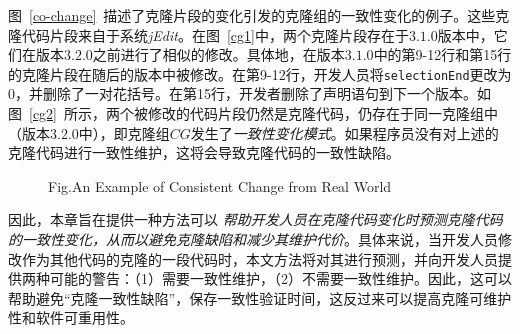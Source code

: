 图~\ref{co-change}~描述了克隆片段的变化引发的克隆组的一致性变化的例子。这些克隆代码片段来自于系统{\em jEdit}。在图~\ref{cg1}中，两个克隆片段存在于$ 3.1.0 $版本中，它们在版本$ 3.2.0 $之前进行了相似的修改。具体地，在版本$ 3.1.0 $中的第9-12行和第15行的克隆片段在随后的版本中被修改。在第9-12行，开发人员将{\tt selectionEnd}更改为$ 0 $，并删除了一对花括号。在第15行，开发者删除了声明语句到下一个版本。如图~\ref{cg2}~所示，两个被修改的代码片段仍然是克隆代码，仍存在于同一克隆组中（版本$ 3.2.0 $中），即克隆组$CG$发生了{\em  一致性变化模式}。如果程序员没有对上述的克隆代码进行一致性维护，这将会导致克隆代码的一致性缺陷。

\begin{figure}[htbp]
\centering
\subfigure{\label{cg1}}\addtocounter{subfigure}{-2}
\subfigure{\label{cg2}}\addtocounter{subfigure}{-2}
{Fig.$\!$}{An Example of Consistent Change from Real World}
\vspace{-1em}
\end{figure}

因此，本章旨在提供一种方法可以 {\em 帮助开发人员在克隆代码变化时预测克隆代码的一致性变化，从而以避免克隆缺陷和减少其维护代价}。具体来说，当开发人员修改作为其他代码的克隆的一段代码时，本文方法将对其进行预测，并向开发人员提供两种可能的警告：（1）需要一致性维护，（2）不需要一致性维护。因此，这可以帮助避免“克隆一致性缺陷”，保存一致性验证时间，这反过来可以提高克隆可维护性和软件可重用性。





